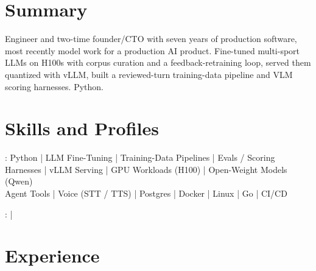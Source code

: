 \documentclass[print]{jack-resume}
\begin{document}
\pagecolor{darkmodeBackground}


\begin{minipage}[t][1cm][t]{.03\textwidth}
    \hfill
\end{minipage}

\section{Summary}
Engineer and two-time founder/CTO with seven years of production software, most recently model work for a production AI product. Fine-tuned multi-sport LLMs on H100s with corpus curation and a feedback-retraining loop, served them quantized with vLLM, built a reviewed-turn training-data pipeline and VLM scoring harnesses. Python.
\sectionsep

\section{Skills and Profiles}
:
Python \hfill | \hfill
LLM Fine-Tuning \hfill | \hfill
Training-Data Pipelines \hfill | \hfill
Evals / Scoring Harnesses \hfill | \hfill
vLLM Serving \hfill | \hfill
GPU Workloads (H100) \hfill | \hfill
Open-Weight Models (Qwen) \\
\hspace{1.0cm} Agent Tools \hfill | \hfill
Voice (STT / TTS) \hfill | \hfill
Postgres \hfill | \hfill
Docker \hfill | \hfill
Linux \hfill | \hfill
Go \hfill | \hfill
CI/CD \\

\raggedright{
    :
      \href{https://www.linkedin.com/in/jack-sturtevant/}{ \ExternalLink} |
     \href{https://github.com/jacksturt}{ \ExternalLink}}

\section{Experience}
\end{document}
